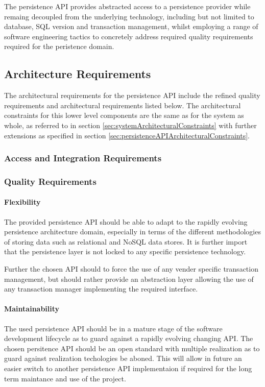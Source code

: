 The persistence API provides abstracted access to a persistence provider while
remaing decoupled from the underlying technology, including but not limited to
database, SQL version and transaction management, whilst employing a range of
software engineering tactics to concretely address required quality
requirements required for the peristence domain.

\subsection{Architecture Requirements}
The architectural requirements for the persistence API include the refined
quality requirements and architectural requirements listed below. The
architectural constraints for this lower level components are the same as for
the system as whole, as referred to in 
section \ref{sec:systemArchitecturalConstraints} with further extensions as
specified in section \ref{sec:persistenceAPIArchitecturalConstraints}.

\subsubsection{Access and Integration Requirements}
\subsubsection{Quality Requirements}
\paragraph{Flexibility}
The provided persistence API should be able to adapt to the rapidly evolving
persistence architecture domain, especially in terms of the different 
methodologies of storing data such as relational and NoSQL data stores. It is
further import that the persistence layer is not locked to any specific
persistence technology.

Further the chosen API should to force the use of any vender specific
transaction management, but should rather provide an abstraction layer allowing
the use of any transaction manager implementing the required interface.

\paragraph{Maintainability}
\label{sec:persistenceAPIMaintainability}
The used persistence API should be in a mature stage of the software development
lifecycle as to guard against a rapidly evolving changing API. The chosen
persitence API should be an open standard with multiple realization as to guard
against realization techologies be aboned. This will allow in future an easier 
switch to another persistence API implementaion if required for the long term
maintance and use of the project.

